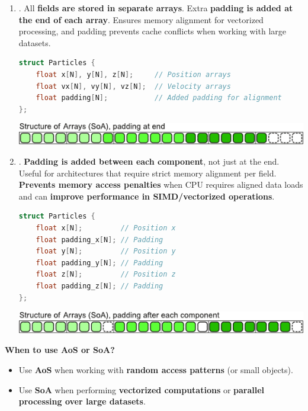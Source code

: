 \begin{enumerate}
    \item {}. All \textbf{fields are stored in separate arrays}. Extra \textbf{padding is added at the end of each array}. Ensures memory alignment for vectorized processing, and padding prevents cache conflicts when working with large datasets.
    \begin{examplebox}
        \begin{lstlisting}[language=c++]
struct Particles {
    float x[N], y[N], z[N];     // Position arrays
    float vx[N], vy[N], vz[N];  // Velocity arrays
    float padding[N];           // Added padding for alignment
};\end{lstlisting}
        \begin{center}
            \includegraphics[width=\textwidth]{img/soa-padding-end-1.pdf}
        \end{center}
    \end{examplebox}


    \item {}. \textbf{Padding is added between each component}, not just at the end. Useful for architectures that require strict memory alignment per field. \textbf{Prevents memory access penalties} when CPU requires aligned data loads and can \textbf{improve performance in SIMD/vectorized operations}.
    \begin{examplebox}
        \begin{lstlisting}[language=c++]
struct Particles {
    float x[N];         // Position x
    float padding_x[N]; // Padding
    float y[N];         // Position y
    float padding_y[N]; // Padding
    float z[N];         // Position z
    float padding_z[N]; // Padding
};\end{lstlisting}
        \begin{center}
            \includegraphics[width=\textwidth]{img/soa-padding-each-struct-1.pdf}
        \end{center}
    \end{examplebox}
\end{enumerate}

\highspace
\begin{flushleft}
    \textcolor{Green3}{ \textbf{When to use AoS or SoA?}}
\end{flushleft}
\begin{itemize}
    \item Use \textbf{AoS} when working with \textbf{random access patterns} (or small objects).
    \item Use \textbf{SoA} when performing \textbf{vectorized computations} or \textbf{parallel processing over large datasets}.
\end{itemize}

